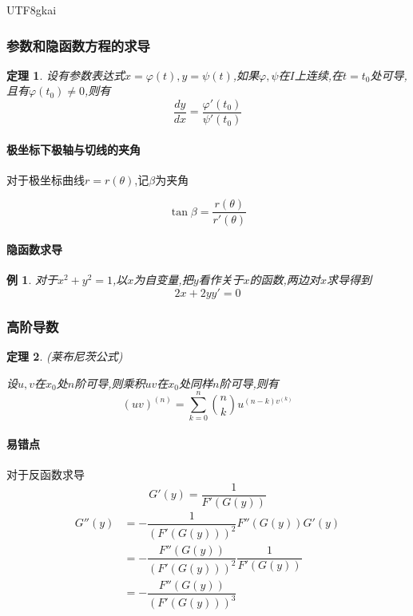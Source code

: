 \documentclass{article}
\newtheorem{theorem}{定理}[subsection]
\newtheorem{example}{例}[subsection]
\newcommand{\parameter}[1]{\left(#1\right)}
\begin{document}
\begin{CJK}{UTF8}{gkai}
\subsubsection{参数和隐函数方程的求导}
\begin{theorem}
  设有参数表达式$x = \varphi(t),y = \psi(t)$,如果$\varphi,\psi$在$I$上连续,在$t = t_0$处可导,且有$\varphi(t_0) \neq 0$,则有
  \[\dfrac{dy}{dx} = \dfrac{\varphi'(t_0)}{\psi'(t_0)}\]
\end{theorem}

\paragraph{极坐标下极轴与切线的夹角\\}
对于极坐标曲线$r = r(\theta)$,$\text{记}\beta\text{为夹角}$

\[\tan \beta = \dfrac{r(\theta)}{r'(\theta)}\]

\paragraph{隐函数求导\\}

\begin{example}
  对于$x^2 + y^2 = 1$,以$x$为自变量,把$y$看作关于$x$的函数,两边对$x$求导得到
  \[2x + 2y y' = 0\]
\end{example}

\subsubsection{高阶导数}

\begin{theorem}
(莱布尼茨公式)  

设$u,v$在$x_0$处$n$阶可导,则乘积$uv$在$x_0$处同样$n$阶可导,则有
\[(uv)^{(n)} = \sum_{k = 0}^n \binom{n}{k} u^{(n - k) v^{(k)}}\]
\end{theorem}

\paragraph{易错点}
对于反函数求导
\[G'(y) = \dfrac{1}{F'(G(y))}\]
\[
\begin{aligned}
  G''(y) &= -\dfrac{1}{\parameter{F'(G(y))}^2} F''(G(y)) G'(y)\\
  &=-\dfrac{F''(G(y))}{\parameter{F'(G(y))}^2}  \dfrac{1}{F'(G(y))}\\
  &=-\dfrac{F''(G(y))}{\parameter{F'(G(y))}^3}\\
\end{aligned}  
\]


\end{CJK}
\end{document}
